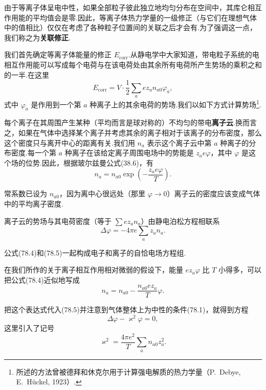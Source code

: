 由于等离子体呈电中性，如果全部粒子彼此独立地均匀分布在空间中，其库仑相互作用能的平均值会是零.因此，等离子体热力学量的一级修正（与它们在理想气体中的值相比）仅仅在考虑了各种粒子位置间的关联之后才会有.为了强调这一点，我们称之为\textbf{关联修正}.

我们首先确定等离子体能量的修正 $E_{\mathrm{corr}}$.从静电学中大家知道，带电粒子系统的电相互作用能可以写成每个电荷与在该电荷处由其余所有电荷所产生势场的乘积之和的一半.在这里
\begin{equation}
  E_{\mathrm{corr}}=V\cdot\frac{1}{2}\sum_aez_an_{a0}\varphi_a,
\end{equation}
式中 $\varphi_a$ 是作用到一个第 $a$ 种离子上的其余电荷的势场.我们以如下方式计算势场\footnote{所述的方法曾被德拜和休克尔用于计算强电解质的热力学量（P.~Debye, E.~Hückel, 1923）.}.

每个离子在其周围产生某种（平均而言是球对称的）不均匀的带电\textbf{离子云}.换而言之，如果在气体中选择某个离子并考虑其余的离子相对于该离子的分布密度，那么这个密度只与离开中心的距离有关.我们用 $n_a$ 表示这个离子云中第 $a$ 种离子的分布密度.每一个第 $a$ 种离子在该给定离子周围电场中的势能是 $z_ae\varphi$，其中 $\varphi$ 是这个场的位势.因此，根据玻尔兹曼公式(38.6)，有
\begin{equation}
  n_a=n_{a0}\exp\left(-\frac{z_ae\varphi}{T}\right).
\end{equation}

常系数已设为 $n_{a0}$，因为离中心很远处（那里 $\varphi\to0$）离子云的密度应该变成气体中的平均离子密度.

离子云的势场与其电荷密度（等于 $\sum ez_an_a$）由静电泊松方程相联系
\begin{equation}
  \Delta\varphi=-4\pi e\sum_az_an_a.
\end{equation}

公式(78.4)和(78.5)一起构成电子和离子的自恰电场方程组.

在我们所作的关于离子相互作用相对微弱的假设下，能量 $ez_a\varphi$ 比 $T$ 小得多，可以把公式(78.4)近似地写成
\begin{equation}
  n_a=n_{a0}-\frac{n_{a0}ez_a}{T}\varphi.
\end{equation}

把这个表达式代入(78.5)并注意到气体整体上为中性的条件(78.1)，就得到方程
\begin{equation}
  \Delta\varphi-\varkappa^2\varphi=0,
\end{equation}
这里引入了记号
\begin{equation}
  \varkappa^2=\frac{4\pi e^2}{T}\sum_an_{a0}z_a^2.
\end{equation}

